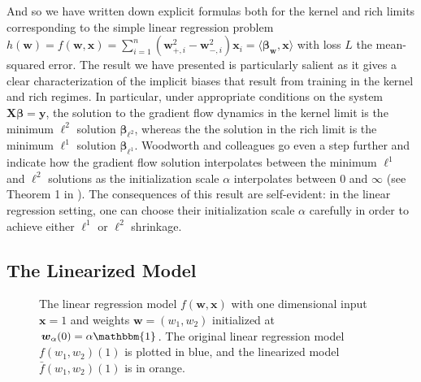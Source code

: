 \documentclass{article}
\begin{document}
And so we have written down explicit formulas both for the kernel and rich limits corresponding to the simple linear regression problem $h(\boldsymbol{w}) = f(\boldsymbol{w}, \boldsymbol{x}) = \sum_{i=1}^n(\boldsymbol{w}_{+, i}^2 - \boldsymbol{w}_{-, i}^2)\boldsymbol{x}_i = \langle \boldsymbol{\beta}_{\boldsymbol{w}}, \boldsymbol{x} \rangle $ with loss $L$ the mean-squared error. The result we have presented is particularly salient as it gives a clear characterization of the implicit biases that result from training in the kernel and rich regimes. In particular, under appropriate conditions on the system $\boldsymbol{X} \boldsymbol{\beta} = \boldsymbol{y}$, the solution to the gradient flow dynamics in the kernel limit is the minimum $\ell^2$ solution $\boldsymbol{\beta}_{\ell^2}$, whereas the the solution in the rich limit is the minimum $\ell^1$ solution $\boldsymbol{\beta}_{\ell^1}$. Woodworth and colleagues go even a step further and indicate how the gradient flow solution interpolates between the minimum $\ell^1$ and $\ell^2 $ solutions as the initialization scale $\alpha$ interpolates between $0$ and $\infty$ (see Theorem 1 in \cite{woodworth2020kernel}). The consequences of this result are self-evident: in the linear regression setting, one can choose their initialization scale $\alpha$ carefully in order to achieve either $\ell^1$ or $\ell^2$ shrinkage.

\subsection{The Linearized Model}

\begin{figure}[H]
    \centering
    \hfill
    \caption{The linear regression model $f(\boldsymbol{w}, \boldsymbol{x})$ with one dimensional input $\boldsymbol{x} = 1$ and weights $\boldsymbol{w} = (w_1, w_2)$ initialized at $\boldsymbol{w}_{\alpha}(0) = \alpha \mathbbm{1}$. The original linear regression model $f(w_1, w_2)(1)$ is plotted in blue, and the linearized model $\bar{f}(w_1, w_2)(1)$ is in orange.}\label{img:linearization}
\end{figure}
\end{document}
